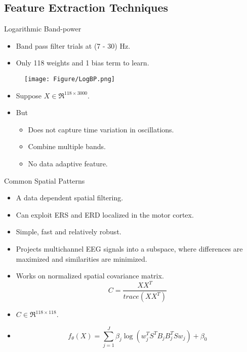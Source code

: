 \documentclass[11pt]{beamer}
\begin{document}
\subsection{Feature Extraction Techniques}
\begin{frame}{Logarithmic Band-power}
\begin{itemize} [ball]
\item Band pass filter trials at (7 - 30) Hz.
\item Only 118 weights and 1 bias term to learn.
  \end{itemize}
\begin{figure}
\texttt{[image: Figure/LogBP.png]}
\end{figure}
\begin{itemize} [ball]
\item Suppose $X\in \Re^{118\times 3000} $.
\item But
\begin{itemize} [circle]
\item Does not capture time variation in oscillations.
\item Combine multiple bands.
\item No data adaptive feature.
  \end{itemize}
  \end{itemize}
 \end{frame}
\begin{frame}{Common Spatial Patterns}
\begin{itemize} [ball]
\item A data dependent spatial filtering.
\item Can exploit ERS and ERD localized in the motor cortex.
\item Simple, fast and relatively robust.
\item Projects multichannel EEG signals into a subspace, where differences are maximized and similarities are minimized.
\item Works on normalized spatial covariance matrix.
\[ C=\frac{XX^T}{trace\left(XX^T\right) } \]
  \end{itemize}
  \begin{itemize} [ball]
\item $C\in \Re^{118\times 118} $.
\item \[f_\theta\left(X\right)=\sum_{j=1}^J \beta_j\log\left(w_j^T S^T B_j B_j^T S w_j\right)+\beta_0 \]
\end{itemize}
 \end{frame}
\end{document}
